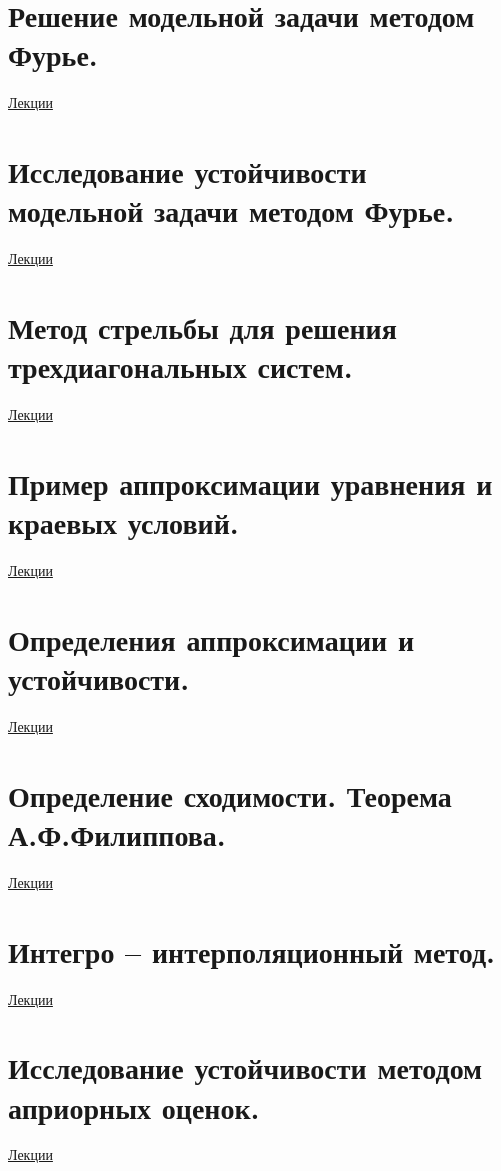 \documentclass[specialist, subf, href, colorlinks=true, 12pt, times, mtpro, final]{disser}
\theoremstyle{definition}
\begin{document}
{\section {Решение модельной задачи методом Фурье.}
    \hyperlink {lects.109}{Лекции}\\

\section {Исследование устойчивости модельной задачи методом Фурье.}
    \hyperlink {lects.111}{Лекции}\\

\section {Метод стрельбы для решения трехдиагональных систем.}
    \hyperlink {lects.112}{Лекции}\\

\section {Пример аппроксимации уравнения и краевых условий.}
    \hyperlink {lects.115}{Лекции}\\

\section {Определения аппроксимации и устойчивости.}
    \hyperlink {lects.118}{Лекции}\\

\section {Определение сходимости. Теорема А.Ф.Филиппова.}
    \hyperlink {lects.120}{Лекции}\\

\section {Интегро -- интерполяционный метод.}
    \hyperlink {lects.121}{Лекции}\\

\section {Исследование устойчивости методом априорных оценок.}
    \hyperlink {lects.125}{Лекции}\\

}
\end{document}
